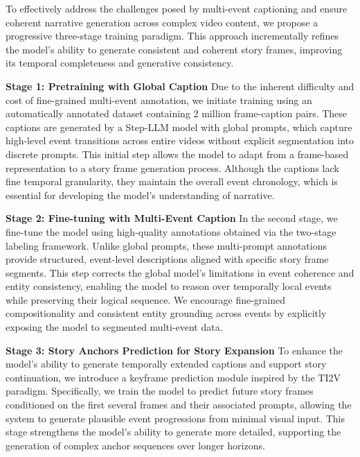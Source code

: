 To effectively address the challenges posed by multi-event captioning and ensure coherent narrative generation across complex video content, we propose a progressive three-stage training paradigm. This approach incrementally refines the model’s ability to generate consistent and coherent story frames, improving its temporal completeness and generative consistency.

\textbf{Stage 1: Pretraining with Global Caption}
Due to the inherent difficulty and cost of fine-grained multi-event annotation, we initiate training using an automatically annotated dataset containing 2 million frame-caption pairs. These captions are generated by a Step-LLM model with global prompts, which capture high-level event transitions across entire videos without explicit segmentation into discrete prompts. 
This initial step allows the model to adapt from a frame-based representation to a story frame generation process. 
Although the captions lack fine temporal granularity, they maintain the overall event chronology, which is essential for developing the model’s understanding of narrative.

\textbf{Stage 2: Fine-tuning with Multi-Event Caption}
In the second stage, we fine-tune the model using high-quality annotations obtained via the two-stage labeling framework. Unlike global prompts, these multi-prompt annotations provide structured, event-level descriptions aligned with specific story frame segments. 
This step corrects the global model’s limitations in event coherence and entity consistency, enabling the model to reason over temporally local events while preserving their logical sequence. 
We encourage fine-grained compositionality and consistent entity grounding across events by explicitly exposing the model to segmented multi-event data.

\textbf{Stage 3: Story Anchors Prediction for Story Expansion}
To enhance the model’s ability to generate temporally extended captions and support story continuation, we introduce a keyframe prediction module inspired by the TI2V paradigm. Specifically, we train the model to predict future story frames conditioned on the first several frames and their associated prompts, allowing the system to generate plausible event progressions from minimal visual input. 
This stage strengthens the model’s ability to generate more detailed, supporting the generation of complex anchor sequences over longer horizons.















